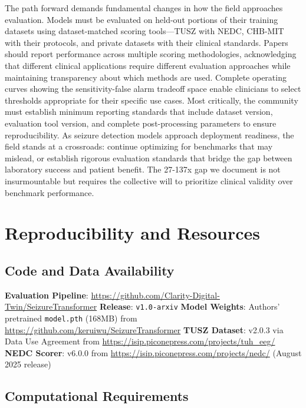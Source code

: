 The path forward demands fundamental changes in how the field approaches
evaluation. Models must be evaluated on held-out portions of their
training datasets using dataset-matched scoring tools---TUSZ with NEDC,
CHB-MIT with their protocols, and private datasets with their clinical
standards. Papers should report performance across multiple scoring
methodologies, acknowledging that different clinical applications
require different evaluation approaches while maintaining transparency
about which methods are used. Complete operating curves showing the
sensitivity-false alarm tradeoff space enable clinicians to select
thresholds appropriate for their specific use cases. Most critically,
the community must establish minimum reporting standards that include
dataset version, evaluation tool version, and complete post-processing
parameters to ensure reproducibility. As seizure detection models
approach deployment readiness, the field stands at a crossroads:
continue optimizing for benchmarks that may mislead, or establish
rigorous evaluation standards that bridge the gap between laboratory
success and patient benefit. The 27-137x gap we document is not
insurmountable but requires the collective will to prioritize clinical
validity over benchmark performance.

\hypertarget{reproducibility-and-resources}{%
\section{Reproducibility and
Resources}\label{reproducibility-and-resources}}

\hypertarget{code-and-data-availability}{%
\subsection{Code and Data
Availability}\label{code-and-data-availability}}

\textbf{Evaluation Pipeline}:
\url{https://github.com/Clarity-Digital-Twin/SeizureTransformer}
\textbf{Release}: \texttt{v1.0-arxiv} \textbf{Model Weights}: Authors'
pretrained \texttt{model.pth} (168MB) from
\url{https://github.com/keruiwu/SeizureTransformer} \textbf{TUSZ
Dataset}: v2.0.3 via Data Use Agreement from
\url{https://isip.piconepress.com/projects/tuh_eeg/} \textbf{NEDC
Scorer}: v6.0.0 from \url{https://isip.piconepress.com/projects/nedc/}
(August 2025 release)

\hypertarget{computational-requirements}{%
\subsection{Computational
Requirements}\label{computational-requirements}}

